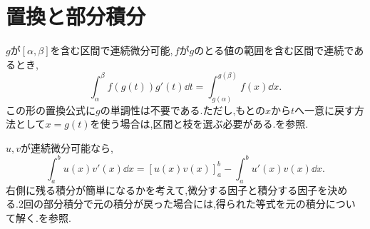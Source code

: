 \section{置換と部分積分}
$g$が$[\alpha,\beta]$を含む区間で連続微分可能,\,$f$が$g$のとる値の範囲を含む区間で連続であるとき,
\[
 \int_\alpha^\beta f(g(t))g'(t)\dd t
 =\int_{g(\alpha)}^{g(\beta)}f(x)\dd x.
\]
この形の置換公式に$g$の単調性は不要である.ただし,もとの$x$から$t$へ一意に戻す方法として$x=g(t)$を使う場合は,区間と枝を選ぶ必要がある.を参照.

$u,v$が連続微分可能なら,
\[
 \int_a^b u(x)v'(x)\dd x
 =[u(x)v(x)]_a^b-\int_a^b u'(x)v(x)\dd x.
\]
右側に残る積分が簡単になるかを考えて,微分する因子と積分する因子を決める.2回の部分積分で元の積分が戻った場合には,得られた等式を元の積分について解く.を参照.


